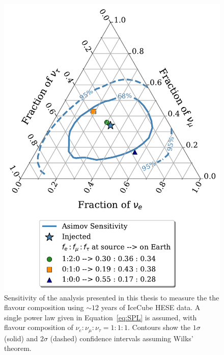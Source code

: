 \begin{figure}[h!]
    \caption{Sensitivity of the analysis presented in this thesis to measure the the flavour composition using $\sim12$ years of IceCube HESE data. A single power law given in Equation~\ref{eq:SPL} is assumed, with flavour composition of $\nu_e:\nu_{\mu}:\nu_{\tau}=1:1:1$. Contours show the $1\sigma$ (solid) and $2\sigma$ (dashed) confidence intervals assuming Wilks' theorem.}
    \includegraphics{./figures/Analysis/Asimov_Sensitivity.pdf}
\end{figure}

